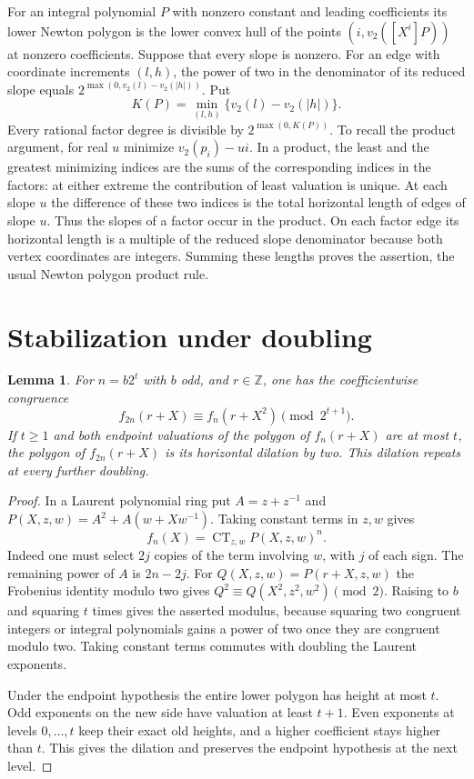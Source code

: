 \documentclass[11pt]{article}
\newtheorem{lemma}[theorem]{Lemma}
\newcommand{\CT}{\operatorname{CT}}
\newcommand{\val}{v_2}
\begin{document}
For an integral polynomial $P$ with nonzero constant and leading coefficients its lower Newton polygon is the lower convex hull of the points $(i,\val([X^i]P))$ at nonzero coefficients. Suppose that every slope is nonzero. For an edge with coordinate increments $(l,h)$, the power of two in the denominator of its reduced slope equals $2^{\max(0,\val(l)-\val(|h|))}$. Put
\[
 K(P)=\min_{(l,h)} \{\val(l)-\val(|h|)\}.
\]
Every rational factor degree is divisible by $2^{\max(0,K(P))}$. To recall the product argument, for real $u$ minimize $\val(p_i)-ui$. In a product, the least and the greatest minimizing indices are the sums of the corresponding indices in the factors: at either extreme the contribution of least valuation is unique. At each slope $u$ the difference of these two indices is the total horizontal length of edges of slope $u$. Thus the slopes of a factor occur in the product. On each factor edge its horizontal length is a multiple of the reduced slope denominator because both vertex coordinates are integers. Summing these lengths proves the assertion, the usual Newton polygon product rule.

\section{Stabilization under doubling}
\begin{lemma}\label{double}
For $n=b2^t$ with $b$ odd, and $r\in\mathbb Z$, one has the coefficientwise congruence
\[
 f_{2n}(r+X)\equiv f_n(r+X^2)\pmod{2^{t+1}}.
\]
If $t\ge1$ and both endpoint valuations of the polygon of $f_n(r+X)$ are at most $t$, the polygon of $f_{2n}(r+X)$ is its horizontal dilation by two. This dilation repeats at every further doubling.
\end{lemma}
\begin{proof}
In a Laurent polynomial ring put $A=z+z^{-1}$ and $P(X,z,w)=A^2+A(w+Xw^{-1})$. Taking constant terms in $z,w$ gives
\[
 f_n(X)=\CT_{z,w}P(X,z,w)^n.
\]
Indeed one must select $2j$ copies of the term involving $w$, with $j$ of each sign. The remaining power of $A$ is $2n-2j$. For $Q(X,z,w)=P(r+X,z,w)$ the Frobenius identity modulo two gives $Q^2\equiv Q(X^2,z^2,w^2)\pmod2$. Raising to $b$ and squaring $t$ times gives the asserted modulus, because squaring two congruent integers or integral polynomials gains a power of two once they are congruent modulo two. Taking constant terms commutes with doubling the Laurent exponents.

Under the endpoint hypothesis the entire lower polygon has height at most $t$. Odd exponents on the new side have valuation at least $t+1$. Even exponents at levels $0,\ldots,t$ keep their exact old heights, and a higher coefficient stays higher than $t$. This gives the dilation and preserves the endpoint hypothesis at the next level.\end{proof}
\end{document}
